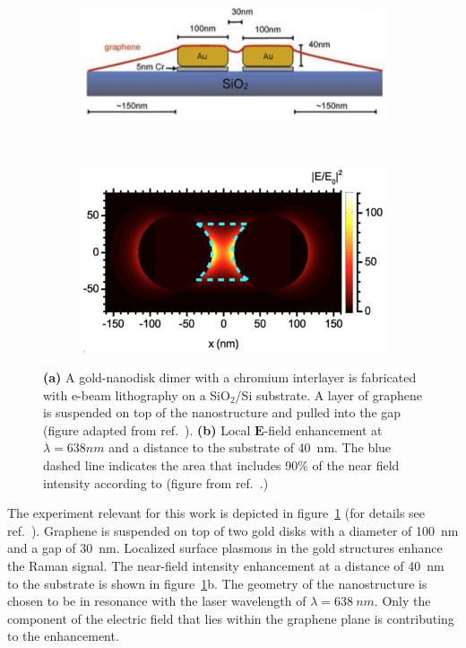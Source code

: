 \begin{figure}[!h]
  \centering
  \begin{subfigure}{0.45\textwidth}
    \includegraphics[width=\textwidth]{./images/sers-schema.png}
  \end{subfigure}
  ~
  \begin{subfigure}{0.45\textwidth}
    \includegraphics[width=\textwidth]{./images/local-enhancement-heeg.png}
  \end{subfigure}
  \caption{\textbf{(a)} A gold-nanodisk dimer with a chromium interlayer is fabricated with e-beam lithography on a SiO$_2$/Si substrate. A layer of graphene is suspended on top of the nanostructure and pulled into the gap (figure adapted from ref.~\cite{heeg}). \textbf{(b)} Local $\mathbf{E}$-field enhancement at $\lambda = 638nm$ and a distance to the substrate of \SI{40}{nm}. The blue dashed line indicates the area that includes 90\% of the near field intensity according to \cite{heeg} (figure from ref.~\cite{heeg}.)}
  \label{fig:heeg-experiment}
\end{figure}

The experiment relevant for this work is depicted in figure~\ref{fig:heeg-experiment} (for details see ref.~\cite{heeg}). Graphene is suspended on top of two gold disks with a diameter of \SI{100}{nm} and a gap of \SI{30}{nm}. Localized surface plasmons in the gold structures enhance the Raman signal. The near-field intensity enhancement at a distance of \SI{40}{nm} to the substrate is shown in figure~\ref{fig:heeg-experiment}b. The geometry of the nanostructure is chosen to be in resonance with the laser wavelength of $\lambda = \SI{638}{nm}$. Only the component of the electric field that lies within the graphene plane is contributing to the enhancement.

